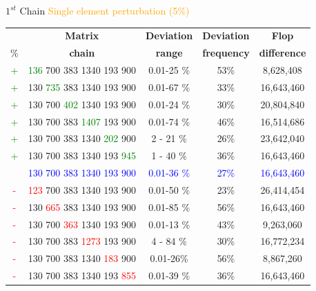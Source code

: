 \documentclass[10pts]{beamer}
\begin{document}
	   \begin{frame}{$1^{st}$ Chain \hspace{30pt} \textcolor{orange}{Single element perturbation (5\%)} }
	      \begin{tabular}{c| c | c |c | c}
	   		&\textbf{Matrix} & \textbf{Deviation} & \textbf{Deviation}& \textbf{Flop }\\
	     	\%&\textbf{chain}  & \textbf{range}     &\textbf{frequency}&\textbf{difference}\\
	   	    \textcolor{green}{+}&\textcolor{green}{136} 700 383 1340 193 900 &	0.01-25 \%	&		53\%	&		8,628,408\\
	   	    \textcolor{green}{+}&130 \textcolor{green}{735} 383 1340 193 900 &	0.01-67 \%	&		33\%	&		16,643,460\\	
	   	    \textcolor{green}{+}&130 700 \textcolor{green}{402} 1340 193 900 &	0.01-24 \%	&		30\%	&		20,804,840\\	
	   	    \textcolor{green}{+}&130 700 383 \textcolor{green}{1407} 193 900 &	0.01-74 \%	&		46\%	&		16,514,686\\
	   	    \textcolor{green}{+}&130 700 383 1340 \textcolor{green}{202} 900 &	2 - 21 \%		&     	26\%	&		23,642,040\\
	   	    \textcolor{green}{+}&130 700 383 1340 193 \textcolor{green}{945} &	1 - 40 \%		&	    36\%	&		16,643,460\\
	   	   	 & \textcolor{blue}{130} \textcolor{blue}{700} \textcolor{blue}{383} \textcolor{blue}{1340} \textcolor{blue}{193} \textcolor{blue}{900} &	\textcolor{blue}{0.01-36 \%}	  &	    \textcolor{blue}{27\%}	&		\textcolor{blue}{16,643,460}\\
	   	   \textcolor{red}{-}& \textcolor{red}{123} 700 383 1340 193 900 &	0.01-50 \%	  &		23\%	&		26,414,454\\
	   	   \textcolor{red}{-}&130 \textcolor{red}{665} 383 1340 193 900 &	0.01-85 \%	  &		56\%	&		16,643,460\\	
	   	   \textcolor{red}{-}&130 700 \textcolor{red}{363} 1340 193 900 &	0.01-13 \%	  & 	43\%	&		9,263,060\\
	   	   \textcolor{red}{-}&130 700 383 \textcolor{red}{1273} 193 900 &	4 - 84 \%		  &	    30\%	&		16,772,234\\
	   	   \textcolor{red}{-}&130 700 383 1340 \textcolor{red}{183} 900 &	0.01-26\%	  &		56\%	&		 8,867,260\\
	   	   \textcolor{red}{-}&130 700 383 1340 193 \textcolor{red}{855} &	0.01-39 \%	  &	    36\%	&		16,643,460\\
	   		
	     \end{tabular}
	   \end{frame}
	   
\end{document}
